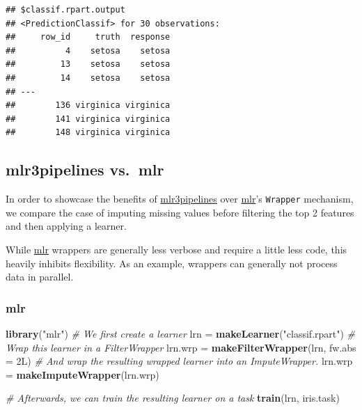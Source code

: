 \documentclass[]{scrbook}
\newenvironment{Shaded}{\begin{snugshade}}{\end{snugshade}}
\newcommand{\CommentTok}[1]{\textcolor[rgb]{0.56,0.35,0.01}{\textit{#1}}}
\newcommand{\DataTypeTok}[1]{\textcolor[rgb]{0.13,0.29,0.53}{#1}}
\newcommand{\KeywordTok}[1]{\textcolor[rgb]{0.13,0.29,0.53}{\textbf{#1}}}
\newcommand{\NormalTok}[1]{#1}
\newcommand{\OperatorTok}[1]{\textcolor[rgb]{0.81,0.36,0.00}{\textbf{#1}}}
\newcommand{\StringTok}[1]{\textcolor[rgb]{0.31,0.60,0.02}{#1}}
\renewenvironment{Shaded} {\begin{snugshade}\small} {\end{snugshade}}
\begin{document}
\begin{Shaded}
\end{Shaded}

\begin{verbatim}
## $classif.rpart.output
## <PredictionClassif> for 30 observations:
##     row_id     truth  response
##          4    setosa    setosa
##         13    setosa    setosa
##         14    setosa    setosa
## ---                           
##        136 virginica virginica
##        141 virginica virginica
##        148 virginica virginica
\end{verbatim}

\hypertarget{mlr3pipelines-vs.mlr}{%
\subsection{mlr3pipelines vs.~mlr}\label{mlr3pipelines-vs.mlr}}

In order to showcase the benefits of \href{https://cran.r-project.org/package=mlr3pipelines}{mlr3pipelines} over \href{https://cran.r-project.org/package=mlr}{mlr}'s \texttt{Wrapper} mechanism, we compare the case of imputing missing values before filtering the top 2 features and then applying a learner.

While \href{https://cran.r-project.org/package=mlr}{mlr} wrappers are generally less verbose and require a little less code, this heavily inhibits flexibility.
As an example, wrappers can generally not process data in parallel.

\hypertarget{mlr}{%
\subsubsection{mlr}\label{mlr}}

\begin{Shaded}
\begin{Highlighting}[]
\KeywordTok{library}\NormalTok{(}\StringTok{"mlr"}\NormalTok{)}
\CommentTok{# We first create a learner}
\NormalTok{lrn =}\StringTok{ }\KeywordTok{makeLearner}\NormalTok{(}\StringTok{"classif.rpart"}\NormalTok{)}
\CommentTok{# Wrap this learner in a FilterWrapper}
\NormalTok{lrn.wrp =}\StringTok{ }\KeywordTok{makeFilterWrapper}\NormalTok{(lrn, }\DataTypeTok{fw.abs =}\NormalTok{ 2L)}
\CommentTok{# And wrap the resulting wrapped learner into an ImputeWrapper.}
\NormalTok{lrn.wrp =}\StringTok{ }\KeywordTok{makeImputeWrapper}\NormalTok{(lrn.wrp)}

\CommentTok{# Afterwards, we can train the resulting learner on a task}
\KeywordTok{train}\NormalTok{(lrn, iris.task)}
\end{Highlighting}
\end{Shaded}
\end{document}
